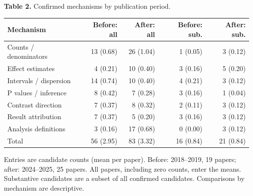\documentclass[11pt,a4paper]{article}
\begin{document}
\begin{center}\begin{minipage}{\linewidth}\small
\textbf{Table 2.} Confirmed mechanisms by publication period.\par\smallskip
\begin{tabularx}{\linewidth}{@{}Xrrrr@{}}
\toprule
Mechanism & Before: all & After: all & Before: sub. & After: sub. \\
\midrule
Counts / denominators & 13 (0.68) & 26 (1.04) & 1 (0.05) & 3 (0.12) \\
Effect estimates & 4 (0.21) & 10 (0.40) & 3 (0.16) & 5 (0.20) \\
Intervals / dispersion & 14 (0.74) & 10 (0.40) & 4 (0.21) & 3 (0.12) \\
P values / inference & 8 (0.42) & 7 (0.28) & 3 (0.16) & 1 (0.04) \\
Contrast direction & 7 (0.37) & 8 (0.32) & 2 (0.11) & 3 (0.12) \\
Result attribution & 7 (0.37) & 5 (0.20) & 3 (0.16) & 3 (0.12) \\
Analysis definitions & 3 (0.16) & 17 (0.68) & 0 (0.00) & 3 (0.12) \\
\midrule
Total & 56 (2.95) & 83 (3.32) & 16 (0.84) & 21 (0.84) \\
\bottomrule\end{tabularx}
\par\smallskip\footnotesize Entries are candidate counts (mean per paper). Before: 2018--2019, 19 papers; after: 2024--2025, 25 papers. All papers, including zero counts, enter the means. Substantive candidates are a subset of all confirmed candidates. Comparisons by mechanism are descriptive.
\end{minipage}\end{center}
\end{document}

